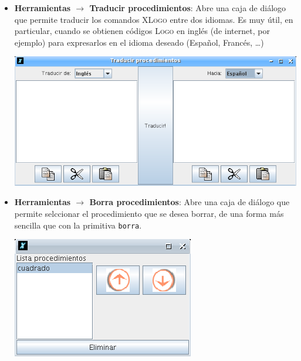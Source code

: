\begin{itemize}
\begin{center}
      \end{center}
      Cualquier procedimiento contenido en estos archivos
      \texttt{.lgo} 
      se convertir\'an en ``\textit{seudo-primitivas}'' del
      lenguaje \textsc{XLogo}. Pero no pueden ser modificadas por el usuario.
      As\'i se pueden definir primitivas personalizadas
      .
   \item \textbf{Herramientas $\rightarrow$ Traducir procedimientos}:
       Abre una caja de di\'alogo que permite
      traducir los comandos \textsc{XLogo} entre dos idiomas. Es muy \'util,
      en particular, cuando se obtienen c\'odigos \textsc{Logo} en ingl\'es
      (de internet, por ejemplo) para expresarlos en el idioma deseado
      (Espa\~nol, Franc\'es, \ldots{})
      \begin{center}
         \includegraphics[scale=0.3]{Imagenes/03_Opciones-Menu/TraducirProcedimientos.png}
      \end{center}
   \item \textbf{Herramientas $\rightarrow$ Borra procedimientos}:
       Abre una caja de di\'alogo que permite
      selccionar el procedimiento que se desea borrar, de una forma m\'as
      sencilla que con la primitiva \texttt{borra}.
      \begin{center}
         \includegraphics[scale=0.3]{Imagenes/03_Opciones-Menu/BorraProcedimientos.png}

\end{center}
\end{itemize}
